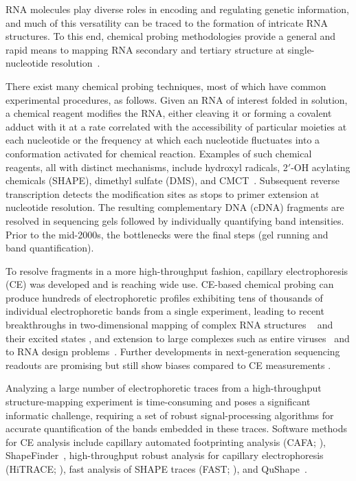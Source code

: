
RNA molecules play diverse roles in encoding and regulating genetic information, and much of this versatility can be traced to the formation of intricate RNA structures. To this end, chemical probing methodologies provide a general and rapid means to mapping RNA secondary and tertiary structure at single-nucleotide resolution~\citep{weeks2010}.

There exist many chemical probing techniques, most of which have common experimental procedures, as follows. Given an RNA of interest folded in solution, a chemical reagent modifies the RNA, either cleaving it or forming a covalent adduct with it at a rate correlated with the accessibility of particular moieties at each nucleotide or the frequency at which each nucleotide fluctuates into a conformation activated for chemical reaction. Examples of such chemical reagents, all with distinct mechanisms, include hydroxyl radicals, 2$'$-OH acylating chemicals (SHAPE), dimethyl sulfate (DMS), and CMCT~\citep{weeks2010}. Subsequent reverse transcription detects the modification sites as stops to primer extension at nucleotide resolution. The resulting complementary DNA (cDNA) fragments are resolved in sequencing gels followed by individually quantifying band intensities. Prior to the mid-2000s, the bottlenecks were the final steps (gel running and band quantification).

To resolve fragments in a more high-throughput fashion, capillary electrophoresis (CE) was developed and is reaching wide use. CE-based chemical probing can produce hundreds of electrophoretic profiles exhibiting tens of thousands of individual electrophoretic bands from a single experiment, leading to recent breakthroughs in two-dimensional mapping of complex RNA structures ~\citep{kladwangmutatemap2011} and their excited states \citep{tian2014nature}, and extension to large complexes such as entire viruses~\citep{weeksnature2009} and to RNA design problems~\citep{lee2014eterna}. Further developments in next-generation sequencing readouts are promising but still show biases compared to CE measurements \citep{Lucks2011,Kladwang2014}.

Analyzing a large number of electrophoretic traces from a high-throughput structure-mapping experiment is time-consuming and poses a significant informatic challenge, requiring a set of robust signal-processing algorithms for accurate quantification of the bands embedded in these traces. Software methods for CE analysis include capillary automated footprinting analysis (CAFA; \citealp{mitra2008high}), ShapeFinder~\citep{vasa2008shapefinder}, high-throughput robust analysis for capillary electrophoresis (HiTRACE; \citealp{Yoon2011}), fast analysis of SHAPE traces (FAST; \citealp{Pang2011}), and QuShape~\citep{Karabiber2013}.

